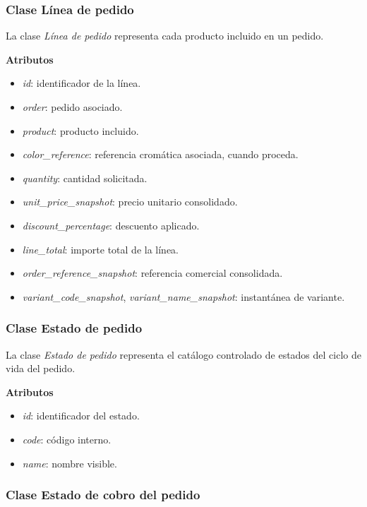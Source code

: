 \subsubsection{Clase Línea de pedido}

La clase \textit{Línea de pedido} representa cada producto incluido en un pedido.

\textbf{Atributos}

\begin{itemize}
      \item \textit{id}: identificador de la línea.
      \item \textit{order}: pedido asociado.
      \item \textit{product}: producto incluido.
      \item \textit{color\_reference}: referencia cromática asociada, cuando proceda.
      \item \textit{quantity}: cantidad solicitada.
      \item \textit{unit\_price\_snapshot}: precio unitario consolidado.
      \item \textit{discount\_percentage}: descuento aplicado.
      \item \textit{line\_total}: importe total de la línea.
      \item \textit{order\_reference\_snapshot}: referencia comercial consolidada.
      \item \textit{variant\_code\_snapshot}, \textit{variant\_name\_snapshot}: instantánea de variante.
\end{itemize}

\subsubsection{Clase Estado de pedido}

La clase \textit{Estado de pedido} representa el catálogo controlado de estados del ciclo de vida del pedido.

\textbf{Atributos}

\begin{itemize}
      \item \textit{id}: identificador del estado.
      \item \textit{code}: código interno.
      \item \textit{name}: nombre visible.
\end{itemize}

\subsubsection{Clase Estado de cobro del pedido}

